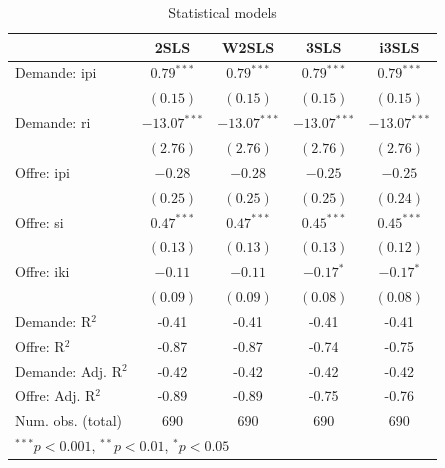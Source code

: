 \documentclass[11pt,]{article}
\begin{document}
\FloatBarrier

\FloatBarrier

\begin{table}[!htbp]
\begin{center}
\begin{tabular}{l c c c c }
\hline
 & 2SLS & W2SLS & 3SLS & i3SLS \\
\hline
Demande: ipi        & $0.79^{***}$   & $0.79^{***}$   & $0.79^{***}$   & $0.79^{***}$   \\
                    & $(0.15)$       & $(0.15)$       & $(0.15)$       & $(0.15)$       \\
Demande: ri         & $-13.07^{***}$ & $-13.07^{***}$ & $-13.07^{***}$ & $-13.07^{***}$ \\
                    & $(2.76)$       & $(2.76)$       & $(2.76)$       & $(2.76)$       \\
Offre: ipi          & $-0.28$        & $-0.28$        & $-0.25$        & $-0.25$        \\
                    & $(0.25)$       & $(0.25)$       & $(0.25)$       & $(0.24)$       \\
Offre: si           & $0.47^{***}$   & $0.47^{***}$   & $0.45^{***}$   & $0.45^{***}$   \\
                    & $(0.13)$       & $(0.13)$       & $(0.13)$       & $(0.12)$       \\
Offre: iki          & $-0.11$        & $-0.11$        & $-0.17^{*}$    & $-0.17^{*}$    \\
                    & $(0.09)$       & $(0.09)$       & $(0.08)$       & $(0.08)$       \\
\hline
Demande: R$^2$      & -0.41          & -0.41          & -0.41          & -0.41          \\
Offre: R$^2$        & -0.87          & -0.87          & -0.74          & -0.75          \\
Demande: Adj. R$^2$ & -0.42          & -0.42          & -0.42          & -0.42          \\
Offre: Adj. R$^2$   & -0.89          & -0.89          & -0.75          & -0.76          \\
Num. obs. (total)   & 690            & 690            & 690            & 690            \\
\hline
\multicolumn{5}{l}{\scriptsize{$^{***}p<0.001$, $^{**}p<0.01$, $^*p<0.05$}}
\end{tabular}
\caption{Statistical models}
\label{table : 2sls, w2sls, 3sls and fiml}
\end{center}
\end{table}
\end{document}
